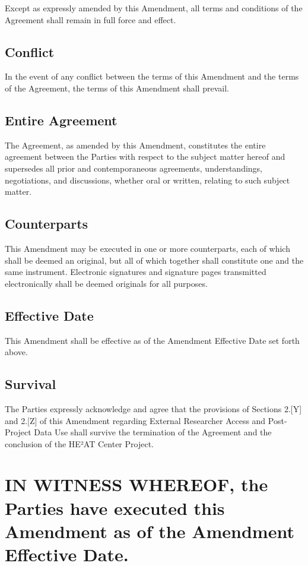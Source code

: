 \documentclass[12pt,letterpaper]{article}
\begin{document}
Except as expressly amended by this Amendment, all terms and conditions of the Agreement shall remain in full force and effect.

\subsection{Conflict}

In the event of any conflict between the terms of this Amendment and the terms of the Agreement, the terms of this Amendment shall prevail.

\subsection{Entire Agreement}

The Agreement, as amended by this Amendment, constitutes the entire agreement between the Parties with respect to the subject matter hereof and supersedes all prior and contemporaneous agreements, understandings, negotiations, and discussions, whether oral or written, relating to such subject matter.

\subsection{Counterparts}

This Amendment may be executed in one or more counterparts, each of which shall be deemed an original, but all of which together shall constitute one and the same instrument. Electronic signatures and signature pages transmitted electronically shall be deemed originals for all purposes.

\subsection{Effective Date}

This Amendment shall be effective as of the Amendment Effective Date set forth above.

\subsection{Survival}

The Parties expressly acknowledge and agree that the provisions of Sections 2.[Y] and 2.[Z] of this Amendment regarding External Researcher Access and Post-Project Data Use shall survive the termination of the Agreement and the conclusion of the HE²AT Center Project.

\section*{IN WITNESS WHEREOF, the Parties have executed this Amendment as of the Amendment Effective Date.}
\end{document}
